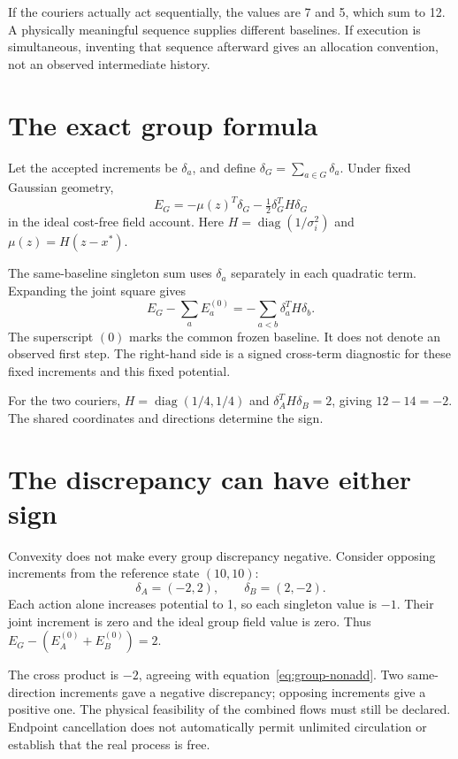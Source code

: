 If the couriers actually act sequentially, the values are 7 and 5, which sum to 12. A physically meaningful sequence supplies different baselines. If execution is simultaneous, inventing that sequence afterward gives an allocation convention, not an observed intermediate history.

\section{The exact group formula}
Let the accepted increments be $\delta_a$, and define $\delta_G=\sum_{a\in G}\delta_a$. Under fixed Gaussian geometry,
\begin{equation}
 E_G=-\mu(z)^T\delta_G-\tfrac12\delta_G^TH\delta_G
\end{equation}
in the ideal cost-free field account. Here $H=\operatorname{diag}(1/\sigma_i^2)$ and $\mu(z)=H(z-x^*)$.

The same-baseline singleton sum uses $\delta_a$ separately in each quadratic term. Expanding the joint square gives
\begin{equation}\label{eq:group-nonadd}
 E_G-\sum_a E_a^{(0)}
 =-\sum_{a<b}\delta_a^TH\delta_b.
\end{equation}
The superscript $(0)$ marks the common frozen baseline. It does not denote an observed first step. The right-hand side is a signed cross-term diagnostic for these fixed increments and this fixed potential.

For the two couriers, $H=\operatorname{diag}(1/4,1/4)$ and $\delta_A^TH\delta_B=2$, giving $12-14=-2$. The shared coordinates and directions determine the sign.


\section{The discrepancy can have either sign}
Convexity does not make every group discrepancy negative. Consider opposing increments from the reference state $(10,10)$:
\[
 \delta_A=(-2,2),\qquad\delta_B=(2,-2).
\]
Each action alone increases potential to 1, so each singleton value is $-1$. Their joint increment is zero and the ideal group field value is zero. Thus $E_G-(E_A^{(0)}+E_B^{(0)})=2$.

The cross product is $-2$, agreeing with equation~\eqref{eq:group-nonadd}. Two same-direction increments gave a negative discrepancy; opposing increments give a positive one. The physical feasibility of the combined flows must still be declared. Endpoint cancellation does not automatically permit unlimited circulation or establish that the real process is free.

